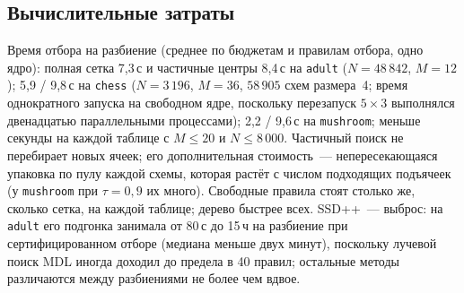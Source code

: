 \documentclass[11pt]{article}
\begin{document}
\subsection{Вычислительные затраты}
Время отбора на разбиение (среднее по бюджетам и правилам отбора, одно ядро): полная сетка 7,3\,с и частичные центры 8,4\,с на \texttt{adult} ($N=48\,842$, $M=12$); 5,9 / 9,8\,с на \texttt{chess} ($N=3\,196$, $M=36$, $58\,905$ схем размера~4; время однократного запуска на свободном ядре, поскольку перезапуск $5\times3$ выполнялся двенадцатью параллельными процессами); 2,2 / 9,6\,с на \texttt{mushroom}; меньше секунды на каждой таблице с $M\le 20$ и $N\le 8\,000$. Частичный поиск не перебирает новых ячеек; его дополнительная стоимость~--- непересекающаяся упаковка по пулу каждой схемы, которая растёт с числом подходящих подъячеек (у \texttt{mushroom} при $\tau=0{,}9$ их много). Свободные правила стоят столько же, сколько сетка, на каждой таблице; дерево быстрее всех. SSD++~--- выброс: на \texttt{adult} его подгонка занимала от 80\,с до 15\,ч на разбиение при сертифицированном отборе (медиана меньше двух минут), поскольку лучевой поиск MDL иногда доходил до предела в 40 правил; остальные методы различаются между разбиениями не более чем вдвое.
\end{document}
